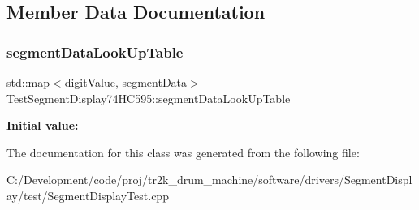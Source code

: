 \subsection{Member Data Documentation}
\mbox{\label{class_test_segment_display74_h_c595_a5adfa8af8f14cedfff1ae6129d423355}} 
\subsubsection{\texorpdfstring{segmentDataLookUpTable}{segmentDataLookUpTable}}
{\footnotesize\ttfamily std\+::map$<$digit\+Value, segment\+Data$>$ Test\+Segment\+Display74\+H\+C595\+::segment\+Data\+Look\+Up\+Table}

{\bfseries Initial value\+:}
\begin{DoxyCode}{0}
\DoxyCodeLine{=}
\DoxyCodeLine{    \{}
\DoxyCodeLine{    \}}

\end{DoxyCode}


The documentation for this class was generated from the following file\+:\begin{DoxyCompactItemize}
\item 
C\+:/\+Development/code/proj/tr2k\+\_\+drum\+\_\+machine/software/drivers/\+Segment\+Display/test/Segment\+Display\+Test.\+cpp\end{DoxyCompactItemize}
